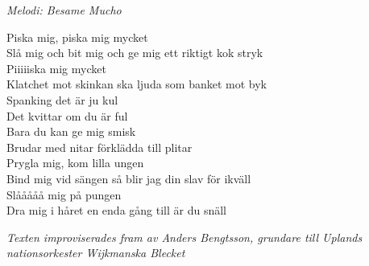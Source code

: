 {\footnotesize\textit{Melodi: Besame Mucho}}\par
\vspace{10pt}
Piska mig, piska mig mycket\\
Slå mig och bit mig och ge mig ett riktigt kok stryk\\
Piiiiiska mig mycket\\
Klatchet mot skinkan ska ljuda som banket mot byk\\
Spanking det är ju kul\\
Det kvittar om du är ful\\
Bara du kan ge mig smisk\\
Brudar med nitar förklädda till plitar\\
Prygla mig, kom lilla ungen\\
Bind mig vid sängen så blir jag din slav för ikväll\\
Slååååå mig på pungen\\
Dra mig i håret en enda gång till är du snäll\par
\vspace{10pt}
{\footnotesize\textit{Texten improviserades fram av Anders Bengtsson, grundare till Uplands nationsorkester Wijkmanska Blecket}}
